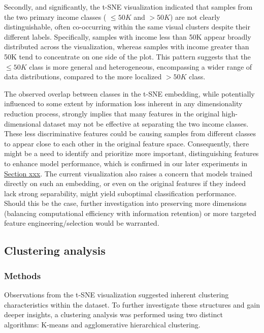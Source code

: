 \documentclass{article}
\begin{document}
Secondly, and significantly, the t-SNE visualization indicated that samples from the two primary income classes ( $\le50K$ and $>50K$) are not clearly distinguishable, often co-occurring within the same visual clusters despite their different labels. Specifically, samples with income less than 50K appear broadly distributed across the visualization, whereas samples with income greater than 50K tend to concentrate on one side of the plot. This pattern suggests that the $\le50K$ class is more general and heterogeneous, encompassing a wider range of data distributions, compared to the more localized $>50K$ class.

The observed overlap between classes in the t-SNE embedding, while potentially influenced to some extent by information loss inherent in any dimensionality reduction process, strongly implies that many features in the original high-dimensional dataset may not be effective at separating the two income classes. These less discriminative features could be causing samples from different classes to appear close to each other in the original feature space. Consequently, there might be a need to identify and prioritize more important, distinguishing features to enhance model performance, which is confirmed in our later experiments in \underline{Section xxx}. The current visualization also raises a concern that models trained directly on such an embedding, or even on the original features if they indeed lack strong separability, might yield suboptimal classification performance. Should this be the case, further investigation into preserving more dimensions (balancing computational efficiency with information retention) or more targeted feature engineering/selection would be warranted.


\subsection{Clustering analysis}





\subsubsection*{Methods}

Observations from the t-SNE visualization suggested inherent clustering characteristics within the dataset. To further investigate these structures and gain deeper insights, a clustering analysis was performed using two distinct algorithms: K-means and agglomerative hierarchical clustering.
\end{document}
